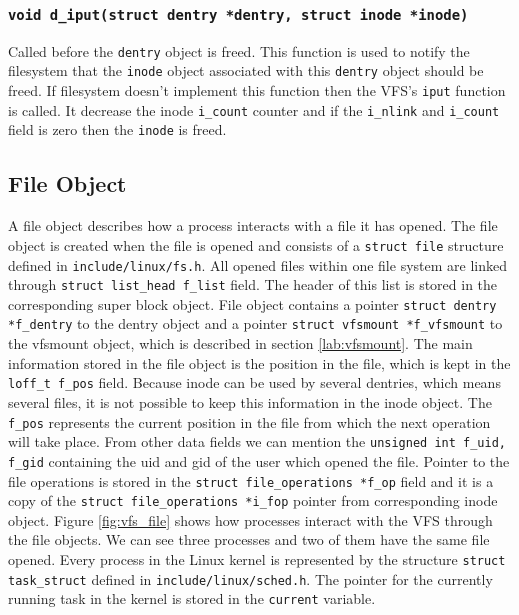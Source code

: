 \subsubsection{\texttt{void d\_iput(struct dentry *dentry, struct inode *inode)}}

Called before the \texttt{dentry} object is freed. This function is used to notify
the filesystem that the \texttt{inode} object associated with this \texttt{dentry}
object should be freed. If filesystem doesn't implement this function then the VFS's
\texttt{iput} function is called. It decrease the inode \texttt{i\_count} counter and
if the \texttt{i\_nlink} and \texttt{i\_count} field is zero then the \texttt{inode} is
freed.

\subsection{File Object}
\label{lab:file}
A file object describes how a process interacts with a file it has opened. The file
object is created when the file is opened and consists of a \texttt{struct file}
structure defined in \texttt{include/linux/fs.h}. All opened files within one file
system are linked through \texttt{struct list\_head f\_list} field. The header of this
list is stored in the corresponding super block object. File object contains a pointer
\texttt{struct dentry *f\_dentry} to the dentry object and a pointer \texttt{struct
vfsmount *f\_vfsmount} to the vfsmount object, which is described in section
\ref{lab:vfsmount}. The main information stored in the file object is the position in the
file, which is kept in the \texttt{loff\_t f\_pos} field. Because inode can be used by
several dentries, which means several files, it is not possible to keep this
information in the inode object. The \texttt{f\_pos} represents the current position in
the file from which the next operation will take place. From other data fields we can
mention the \texttt{unsigned int f\_uid, f\_gid} containing the uid and gid of
the user which opened the file. Pointer to the file operations is stored in the
\texttt{struct file\_operations *f\_op} field and it is a copy of the \texttt{struct
file\_operations *i\_fop} pointer from corresponding inode object. Figure
\ref{fig:vfs_file} shows how processes interact with the VFS through the file
objects. We can see three processes and two of them have the same file opened. Every
process in the Linux kernel is represented by the structure \texttt{struct task\_struct}
defined in \texttt{include/linux/sched.h}. The pointer for the currently running task
in the kernel is stored in the \texttt{current} variable. 

